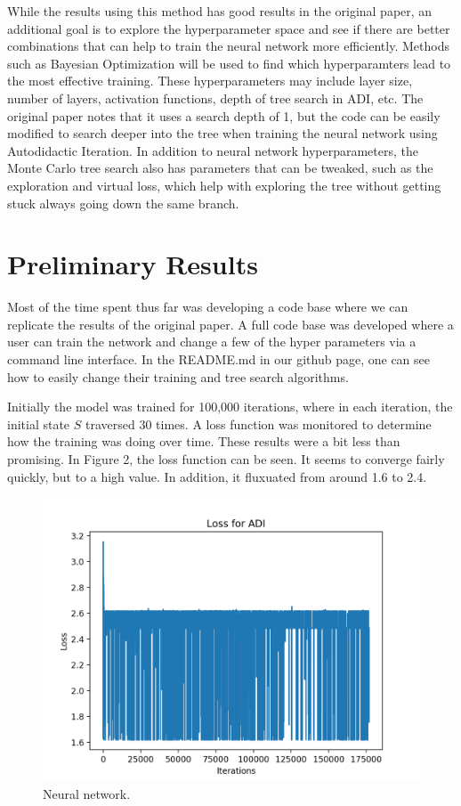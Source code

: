 \documentclass[10pt,twocolumn,letterpaper]{article}
\begin{document}
While the results using this method has good results in the original paper, an additional goal is to explore the hyperparameter space  and see if there are better combinations that can help to train the neural network more efficiently. Methods such as Bayesian Optimization will be used to find which hyperparamters lead to the most effective training. These hyperparameters may include layer size, number of layers, activation functions, depth of tree search in ADI, etc. The original paper notes that it uses a search depth of 1, but the code can be easily modified to search deeper into the tree when training the neural network using Autodidactic Iteration. In addition to neural network hyperparameters, the Monte Carlo tree search also has parameters that can be tweaked, such as the exploration and virtual loss, which help with exploring the tree without getting stuck always going down the same branch.


\section{Preliminary Results}
Most of the time spent thus far was developing a code base where we can replicate the results of the original paper. A full code base was developed where a user can train the network and change a few of the hyper parameters via a command line interface. In the README.md in our github page, one can see how to easily change their training and tree search algorithms. 

Initially the model was trained for 100,000 iterations, where in each iteration, the initial state $S$ traversed 30 times. A loss function was monitored to determine how the training was doing over time. These results were a bit less than promising. In Figure 2, the loss function can be seen. It seems to converge fairly quickly, but to a high value. In addition, it fluxuated from around 1.6 to 2.4. 

\begin{figure}
  \includegraphics[width=\linewidth]{loss.png}
  \caption{Neural network.}
  \label{fig:net}
\end{figure}
\end{document}
